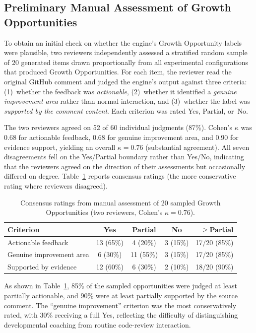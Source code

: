 \documentclass[a4paper,UKenglish,cleveref,autoref]{lipics-v2021}
\begin{document}
\subsection{Preliminary Manual Assessment of Growth Opportunities}
To obtain an initial check on whether the engine's Growth Opportunity labels were plausible, two reviewers independently assessed a stratified random sample of 20 generated items drawn proportionally from all experimental configurations that produced Growth Opportunities. For each item, the reviewer read the original GitHub comment and judged the engine's output against three criteria: (1)~whether the feedback was \textit{actionable}, (2)~whether it identified a \textit{genuine improvement area} rather than normal interaction, and (3)~whether the label was \textit{supported by the comment content}. Each criterion was rated Yes, Partial, or~No.

The two reviewers agreed on 52 of 60 individual judgments (87\%). Cohen's $\kappa$ was 0.68 for actionable feedback, 0.68 for genuine improvement area, and 0.90 for evidence support, yielding an overall $\kappa = 0.76$ (substantial agreement). All seven disagreements fell on the Yes/Partial boundary rather than Yes/No, indicating that the reviewers agreed on the direction of their assessments but occasionally differed on degree. Table~\ref{tab:manual-validation} reports consensus ratings (the more conservative rating where reviewers disagreed).

\begin{table}[!tbp]
\centering
\caption{Consensus ratings from manual assessment of 20 sampled Growth Opportunities (two reviewers, Cohen's $\kappa = 0.76$).}
\label{tab:manual-validation}
\begin{tabular}{lcccr}
\toprule
\textbf{Criterion} & \textbf{Yes} & \textbf{Partial} & \textbf{No} & \textbf{$\geq$Partial} \\
\midrule
Actionable feedback      & 13 (65\%) & 4 (20\%) & 3 (15\%) & 17/20 (85\%) \\
Genuine improvement area &  6 (30\%) & 11 (55\%) & 3 (15\%) & 17/20 (85\%) \\
Supported by evidence    & 12 (60\%) &  6 (30\%) & 2 (10\%) & 18/20 (90\%) \\
\bottomrule
\end{tabular}
\end{table}

As shown in Table~\ref{tab:manual-validation}, 85\% of the sampled opportunities were judged at least partially actionable, and 90\% were at least partially supported by the source comment. The ``genuine improvement'' criterion was the most conservatively rated, with 30\% receiving a full Yes, reflecting the difficulty of distinguishing developmental coaching from routine code-review interaction.
\end{document}
